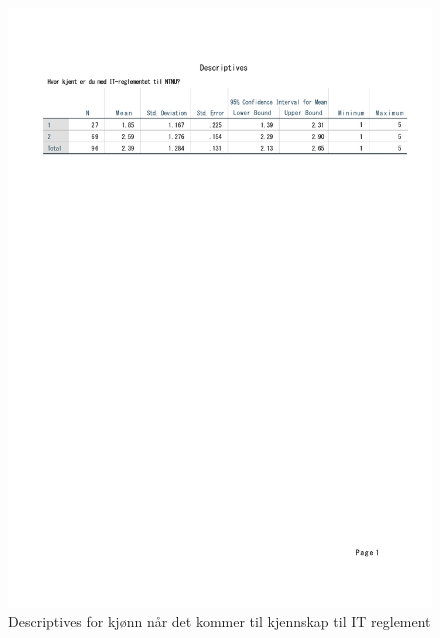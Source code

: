 \begin{figure}[H]
    \centering
    \includegraphics[scale=0.6]{case_1/bilder/kjonn_kjent_descriptive.pdf}
    \caption{Descriptives for kjønn når det kommer til kjennskap til IT reglement}
    \label{fig:fakultet_pastander_descriptive}
\end{figure}

